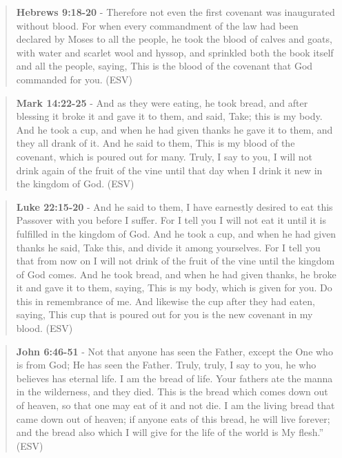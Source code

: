 \documentclass[11pt]{article}
\begin{document}
\begin{quote}
\textbf{Hebrews 9:18-20} - Therefore not even the first covenant was inaugurated without blood. For when every commandment of the law had been declared by Moses to all the people, he took the blood of calves and goats, with water and scarlet wool and hyssop, and sprinkled both the book itself and all the people, saying, This is the blood of the covenant that God commanded for you. (ESV)
\end{quote}

\begin{quote}
\textbf{Mark 14:22-25} - And as they were eating, he took bread, and after blessing it broke it and gave it to them, and said, Take; this is my body. And he took a cup, and when he had given thanks he gave it to them, and they all drank of it. And he said to them, This is my blood of the covenant, which is poured out for many. Truly, I say to you, I will not drink again of the fruit of the vine until that day when I drink it new in the kingdom of God. (ESV)
\end{quote}

\begin{quote}
\textbf{Luke 22:15-20} - And he said to them, I have earnestly desired to eat this Passover with you before I suffer. For I tell you I will not eat it until it is fulfilled in the kingdom of God. And he took a cup, and when he had given thanks he said, Take this, and divide it among yourselves. For I tell you that from now on I will not drink of the fruit of the vine until the kingdom of God comes. And he took bread, and when he had given thanks, he broke it and gave it to them, saying, This is my body, which is given for you. Do this in remembrance of me. And likewise the cup after they had eaten, saying, This cup that is poured out for you is the new covenant in my blood. (ESV)
\end{quote}

\begin{quote}
\textbf{John 6:46-51} - Not that anyone has seen the Father, except the One who is from God; He has seen the Father. Truly, truly, I say to you, he who believes has eternal life. I am the bread of life. Your fathers ate the manna in the wilderness, and they died. This is the bread which comes down out of heaven, so that one may eat of it and not die. I am the living bread that came down out of heaven; if anyone eats of this bread, he will live forever; and the bread also which I will give for the life of the world is My flesh.” (ESV)
\end{quote}
\end{document}
